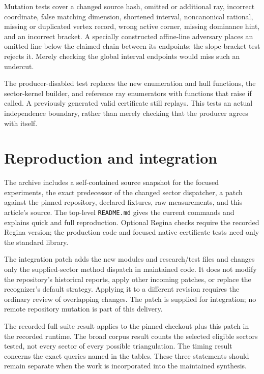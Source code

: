 \documentclass[11pt]{article}
\theoremstyle{definition}
\theoremstyle{remark}
\begin{document}
Mutation tests cover a changed source hash, omitted or additional ray,
incorrect coordinate, false matching dimension, shortened interval,
noncanonical rational, missing or duplicated vertex record, wrong active
corner, missing dominance hint, and an incorrect bracket. A specially
constructed affine-line adversary places an omitted line below the claimed
chain between its endpoints; the slope-bracket test rejects it. Merely
checking the global interval endpoints would miss such an undercut.

The producer-disabled test replaces the new enumeration and hull functions,
the sector-kernel builder, and reference ray enumerators with functions that
raise if called. A previously generated valid certificate still replays.
This tests an actual independence boundary, rather than merely checking that
the producer agrees with itself.

\section{Reproduction and integration}
\label{app:reproduction}

The archive includes a self-contained source snapshot for the focused
experiments, the exact predecessor of the changed sector dispatcher, a patch
against the pinned repository, declared fixtures, raw measurements, and this
article's source. The top-level \texttt{README.md} gives the current commands
and explains quick and full reproduction. Optional Regina checks require the
recorded Regina version; the production code and focused native certificate
tests need only the standard library.

The integration patch adds the new modules and research/test files and changes
only the supplied-sector method dispatch in maintained code. It does not
modify the repository's historical reports, apply other incoming patches, or
replace the recognizer's default strategy. Applying it to a different revision
requires the ordinary review of overlapping changes. The patch is supplied
for integration; no remote repository mutation is part of this delivery.

The recorded full-suite result applies to the pinned checkout plus this
patch in the recorded runtime. The broad corpus result counts the selected
eligible sectors tested, not every sector of every possible triangulation.
The timing result concerns the exact queries named in the tables. These
three statements should remain separate when the work is incorporated into
the maintained synthesis.
\end{document}
